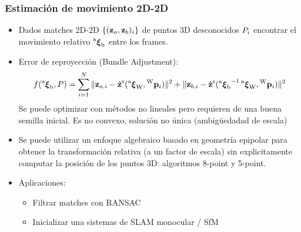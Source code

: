 \begin{frame}
\end{frame}

\begin{frame}
    \frametitle{Estimación de movimiento 2D-2D}
    \footnotesize
    
    \begin{itemize}
        \item Dados matches 2D-2D $\{(\boldsymbol{\mathbf{z}}_{a}, \boldsymbol{\mathbf{z}}_{b})_{i}\}$ de puntos 3D desconocidos $P_{i}$ encontrar el movimiento relativo $\prescript{\mathrm{a}}{}{{\boldsymbol{\mathbf{\xi}}}_\mathrm{b}}$ entre los frames.
        \item Error de reproyección (Bundle Adjustment):
        \[
        f(\prescript{\mathrm{a}}{}{{\boldsymbol{\mathbf{\xi}}}_\mathrm{b}}, P)= \sum_{i=1}^{N} \Vert \boldsymbol{\mathbf{z}}_{a,i} - \hat{\boldsymbol{\mathbf{z}}}^{\mathrm{s}}(\prescript{\mathrm{a}}{}{{\boldsymbol{\mathbf{\xi}}}_\mathrm{\mathrm{W}}},\prescript{\mathrm{\mathrm{W}}}{}{\boldsymbol{\mathbf{p}}}_{i}) \Vert^{2} + \Vert \boldsymbol{\mathbf{z}}_{b,i} - \hat{\boldsymbol{\mathbf{z}}}^{\mathrm{s}}({\prescript{\mathrm{a}}{}{{\boldsymbol{\mathbf{\xi}}}_\mathrm{b}}}^{-1}\prescript{\mathrm{a}}{}{{\boldsymbol{\mathbf{\xi}}}_\mathrm{\mathrm{W}}},\prescript{\mathrm{\mathrm{W}}}{}{\boldsymbol{\mathbf{p}}}_{i}) \Vert^{2}
        \]
        Se puede optimizar con métodos no lineales pero requieren de una buena semilla inicial. Es no convexo, solución no única (ambigüedadad de escala)
        \item Se puede utilizar un enfoque algebraico basado en geometría epipolar para obtener la transformación relativa (a un factor de escala) sin explicitamente computar la posición de los puntos 3D: algoritmos 8-point y 5-point.
        \item Aplicaciones:
        \begin{itemize}
            \item Filtrar matches con RANSAC
            \item Inicializar una sistemas de SLAM monocular / SfM
        \end{itemize}
    \end{itemize}
\end{frame}

